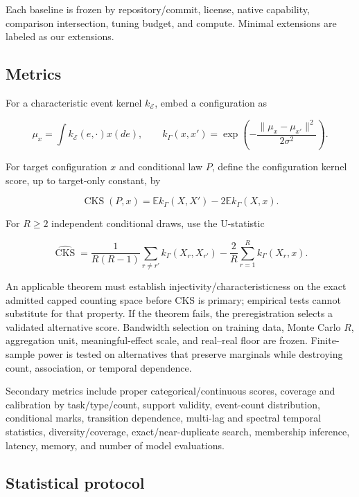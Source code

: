 \documentclass[11pt]{article}
\begin{document}
Each baseline is frozen by repository/\allowbreak{}commit, license, native capability, comparison intersection, tuning budget, and compute. Minimal extensions are labeled as our extensions.

\subsection{Metrics}
\label{sec:metrics}

For a characteristic event kernel \(k_{\mathcal E}\), embed a configuration as

\[
\mu_x=\int k_{\mathcal E}(e,\cdot)x(de),
\qquad
k_\Gamma(x,x')
=\exp\!\left(-\frac{\|\mu_x-\mu_{x'}\|^2}{2\sigma^2}\right).
\]

For target configuration \(x\) and conditional law \(P\), define the configuration kernel score, up to target-only constant, by

\[
\operatorname{CKS}(P,x)
=\mathbb E k_\Gamma(X,X')-2\mathbb E k_\Gamma(X,x).
\]

For \(R\ge2\) independent conditional draws, use the U-statistic

\[
\widehat{\operatorname{CKS}}
=\frac{1}{R(R-1)}\sum_{r\ne r'}k_\Gamma(X_r,X_{r'})
-\frac{2}{R}\sum_{r=1}^R k_\Gamma(X_r,x).
\]

An applicable theorem must establish injectivity/\allowbreak{}characteristicness on the exact admitted capped counting space before CKS is primary; empirical tests cannot substitute for that property. If the theorem fails, the preregistration selects a validated alternative score. Bandwidth selection on training data, Monte Carlo \(R\), aggregation unit, meaningful-effect scale, and real--real floor are frozen. Finite-sample power is tested on alternatives that preserve marginals while destroying count, association, or temporal dependence.

Secondary metrics include proper categorical/\allowbreak{}continuous scores, coverage and calibration by task/\allowbreak{}type/\allowbreak{}count, support validity, event-count distribution, conditional marks, transition dependence, multi-lag and spectral temporal statistics, diversity/\allowbreak{}coverage, exact/\allowbreak{}near-duplicate search, membership inference, latency, memory, and number of model evaluations.

\subsection{Statistical protocol}
\label{sec:statistical-protocol}
\end{document}
